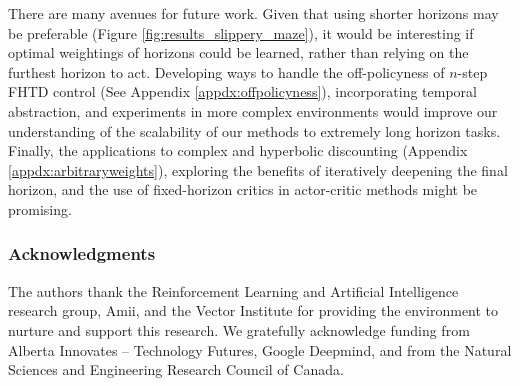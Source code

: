 \documentclass[letterpaper]{article} %
\begin{document}
There are many avenues for future work. Given that using shorter horizons may be preferable (Figure \ref{fig:results_slippery_maze}), it would be interesting if optimal weightings of horizons could be learned, rather than relying on %
the furthest horizon to act. Developing ways to handle the off-policyness of $n$-step FHTD control (See Appendix \ref{appdx:offpolicyness}), incorporating temporal abstraction, and experiments in more complex environments %
would improve our understanding of the scalability of our methods to extremely long horizon tasks.
Finally, the applications to complex and hyperbolic discounting (Appendix \ref{appdx:arbitraryweights}), exploring the benefits of iteratively deepening the final horizon, and the use of fixed-horizon critics in actor-critic methods might be promising.

\subsubsection*{Acknowledgments}
The authors thank the Reinforcement Learning and Artificial Intelligence research group, Amii, and the Vector Institute for providing the environment to nurture and support this research. We gratefully acknowledge funding from Alberta Innovates -- Technology Futures, Google Deepmind, and from the Natural Sciences and Engineering Research Council of Canada.




\newpage

\end{document}
